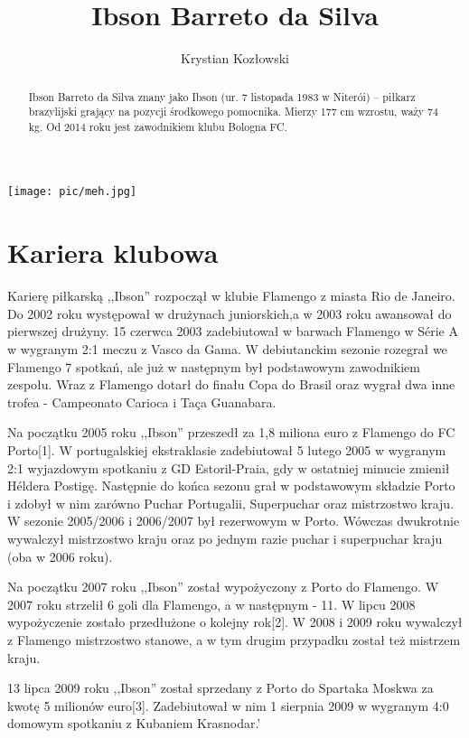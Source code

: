 \documentclass[a4paper,12pt]{article}
\title{Ibson Barreto da Silva}
\author{Krystian Kozłowski}
\begin{document}
\maketitle

\begin{abstract}
Ibson Barreto da Silva znany jako Ibson (ur. 7 listopada 1983 w Niterói) – piłkarz brazylijski grający na pozycji środkowego pomocnika. Mierzy 177 cm wzrostu, waży 74 kg. Od 2014 roku jest zawodnikiem klubu Bologna FC.
\end{abstract}
\begin{center}
\texttt{[image: pic/meh.jpg]}
\end{center}


\section{Kariera klubowa}
Karierę piłkarską ,,Ibson'' rozpoczął w klubie Flamengo z miasta Rio de Janeiro. Do 2002 roku występował w drużynach juniorskich,a w 2003 roku awansował do pierwszej drużyny. 15 czerwca 2003 zadebiutował w barwach Flamengo w Série A w wygranym 2:1 meczu z Vasco da Gama. W debiutanckim sezonie rozegrał we Flamengo 7 spotkań, ale już w następnym był podstawowym zawodnikiem zespołu. Wraz z Flamengo dotarł do finału Copa do Brasil oraz wygrał dwa inne trofea - Campeonato Carioca i Taça Guanabara.

Na początku 2005 roku ,,Ibson'' przeszedł za 1,8 miliona euro z Flamengo do FC Porto[1]. W portugalskiej ekstraklasie zadebiutował 5 lutego 2005 w wygranym 2:1 wyjazdowym spotkaniu z GD Estoril-Praia, gdy w ostatniej minucie zmienił Héldera Postigę. Następnie do końca sezonu grał w podstawowym składzie Porto i zdobył w nim zarówno Puchar Portugalii, Superpuchar oraz mistrzostwo kraju. W sezonie 2005/2006 i 2006/2007 był rezerwowym w Porto. Wówczas dwukrotnie wywalczył mistrzostwo kraju oraz po jednym razie puchar i superpuchar kraju (oba w 2006 roku).

Na początku 2007 roku ,,Ibson'' został wypożyczony z Porto do Flamengo. W 2007 roku strzelił 6 goli dla Flamengo, a w następnym - 11. W lipcu 2008 wypożyczenie zostało przedłużone o kolejny rok[2]. W 2008 i 2009 roku wywalczył z Flamengo mistrzostwo stanowe, a w tym drugim przypadku został też mistrzem kraju.

13 lipca 2009 roku ,,Ibson'' został sprzedany z Porto do Spartaka Moskwa za kwotę 5 milionów euro[3]. Zadebiutował w nim 1 sierpnia 2009 w wygranym 4:0 domowym spotkaniu z Kubaniem Krasnodar.'
\end{document}
